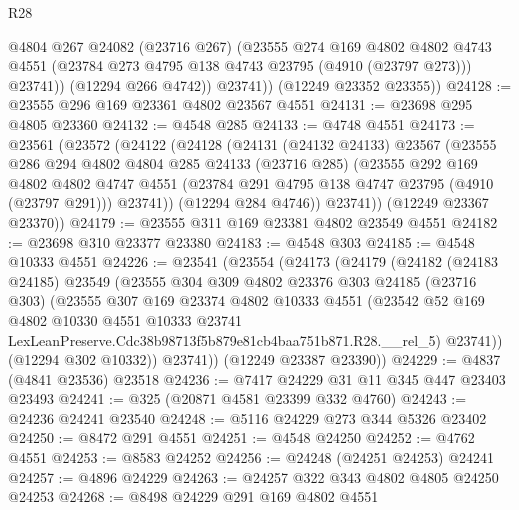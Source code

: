 \begin{lexlean}{R28}
\begin{coremodule}
              @4804
              @267
              @24082
              (@23716 @267)
              (@23555
                @274
                @169
                @4802
                @4802
                @4743
                @4551
                (@23784 @273 @4795 @138 @4743 @23795 (@4910 (@23797 @273)))
                @23741))
            (@12294 @266 @4742))
          @23741))
      (@12249 @23352 @23355))
@24128 := @23555 @296 @169 @23361 @4802 @23567 @4551
@24131 := @23698 @295 @4805 @23360
@24132 := @4548 @285
@24133 := @4748 @4551
@24173 := @23561
    (@23572
      (@24122
        (@24128
          (@24131
            (@24132 @24133)
            @23567
            (@23555
              @286
              @294
              @4802
              @4804
              @285
              @24133
              (@23716 @285)
              (@23555
                @292
                @169
                @4802
                @4802
                @4747
                @4551
                (@23784 @291 @4795 @138 @4747 @23795 (@4910 (@23797 @291)))
                @23741))
            (@12294 @284 @4746))
          @23741))
      (@12249 @23367 @23370))
@24179 := @23555 @311 @169 @23381 @4802 @23549 @4551
@24182 := @23698 @310 @23377 @23380
@24183 := @4548 @303
@24185 := @4548 @10333 @4551
@24226 := @23541
    (@23554
      (@24173
        (@24179
          (@24182
            (@24183 @24185)
            @23549
            (@23555
              @304
              @309
              @4802
              @23376
              @303
              @24185
              (@23716 @303)
              (@23555
                @307
                @169
                @23374
                @4802
                @10333
                @4551
                (@23542
                  @52
                  @169
                  @4802
                  @10330
                  @4551
                  @10333
                  @23741
                  LexLeanPreserve.Cdc38b98713f5b879e81cb4baa751b871.R28.__rel_5)
                @23741))
            (@12294 @302 @10332))
          @23741))
      (@12249 @23387 @23390))
@24229 := @4837 (@4841 @23536) @23518
@24236 := @7417 @24229 @31 @11 @345 @447 @23403 @23493
@24241 := @325 (@20871 @4581 @23399 @332 @4760)
@24243 := @24236 @24241 @23540
@24248 := @5116 @24229 @273 @344 @5326 @23402
@24250 := @8472 @291 @4551
@24251 := @4548 @24250
@24252 := @4762 @4551
@24253 := @8583 @24252
@24256 := @24248 (@24251 @24253) @24241
@24257 := @4896 @24229
@24263 := @24257 @322 @343 @4802 @4805 @24250 @24253
@24268 := @8498 @24229 @291 @169 @4802 @4551

\end{coremodule}
\end{lexlean}
